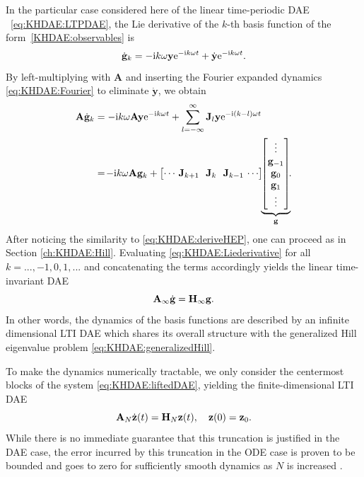 \documentclass[a4paper, nonatbib, 3p, twocolumn]{elsarticle}
\theoremstyle{plain}
\theoremstyle{definition}
\theoremstyle{remark}
\newcommand{\ic}{\ri} %
\newcommand{\ex}{\re} %
\newcommand{\re}{\mathrm e}
\newcommand{\ri}{\mathrm i}
\newcommand{\vg}{\mathbf g}
\newcommand{\vy}{\mathbf y}
\newcommand{\vz}{\mathbf z}
\newcommand{\vA}{\mathbf A}
\newcommand{\vH}{\mathbf H}
\newcommand{\vJ}{\mathbf J}
\begin{document}
In the particular case considered here of the linear time-periodic DAE ~\eqref{eq:KHDAE:LTPDAE}, the Lie derivative of the $k$-th basis function of the form~\eqref{KHDAE:observables} is
\begin{equation}
	\dot{\mathrm{\vg}}_k=-\ic k\omega\vy \ex^{-\ic k\omega t}+\dot{\vy}\ex^{-\ic k\omega t}\textnormal{.}
\end{equation}
By left-multiplying with $\vA$ and inserting the Fourier expanded dynamics \eqref{eq:KHDAE:Fourier} to eliminate $\dot{\vy}$, we obtain
\begin{align}\label{eq:KHDAE:Liederivative}
	\vA\dot{\mathrm{\vg}}_k&=-\ic k\omega\vA\vy \ex^{-\ic k\omega t} +\sum_{l=-\infty}^{\infty}\vJ_l\vy\ex^{-\ic(k-l)\omega t}\nonumber\\
	&=\! -\ic k\omega\vA\vg_k + 
	\left[\begin{matrix}
		\cdots \!\!\!\!& \vJ_{k+1}\!\! & \vJ_{k}\!\! & \vJ_{k-1} \!\!\!\!&\cdots
	\end{matrix}\right]\!\!
	\underbrace{\begin{bmatrix}
		\vdots \\ \vg_{-1} \\ \vg_{0} \\ \vg_{1} \\ \vdots
	\end{bmatrix}}_\vg\!\!\textnormal{.}
\end{align}
After noticing the similarity to \eqref{eq:KHDAE:deriveHEP}, one can proceed as in Section \ref{ch:KHDAE:Hill}.
Evaluating \eqref{eq:KHDAE:Liederivative} for all $k= ...,-1,0,1,...$ and concatenating the terms accordingly yields the linear time-invariant DAE
\begin{equation}\label{eq:KHDAE:liftedDAE}
\vA_\infty\dot{\vg}=\vH_\infty	\vg \textnormal{.}
\end{equation}
In other words, the dynamics of the basis functions are described by an infinite dimensional LTI DAE which shares its overall structure with the generalized Hill eigenvalue problem \eqref{eq:KHDAE:generalizedHill}.

To make the dynamics numerically tractable, we only consider the centermost blocks of the system \eqref{eq:KHDAE:liftedDAE}, yielding the finite-dimensional LTI DAE
\begin{equation}\label{eq:KHDAE:truncatedDAE}
	\vA_N\dot{\vz}(t)=\vH_N\vz(t), \quad \vz(0)=\vz_0\textnormal{.}
\end{equation}
While there is no immediate guarantee that this truncation is justified in the DAE case, the error incurred by this truncation in the ODE case is proven to be bounded and goes to zero for sufficiently smooth dynamics as $N$ is increased \cite{Bayer2024}.
\end{document}

